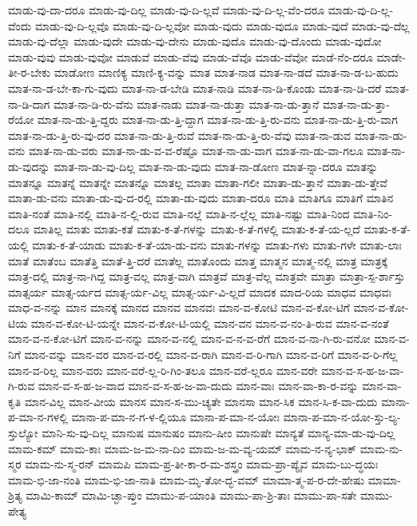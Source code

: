 {ಮಾಡು-ವು-ದಾ-ದರೂ
ಮಾಡು-ವು-ದಿಲ್ಲ
ಮಾಡು-ವು-ದಿ-ಲ್ಲವೆ
ಮಾಡು-ವು-ದಿ-ಲ್ಲ-ವೆಂ-ದರೂ
ಮಾಡು-ವು-ದಿ-ಲ್ಲ-ವೆಂದು
ಮಾಡು-ವು-ದಿ-ಲ್ಲವೊ
ಮಾಡು-ವು-ದಿ-ಲ್ಲವೋ
ಮಾಡು-ವುದು
ಮಾಡು-ವುದೂ
ಮಾಡು-ವುದೆ
ಮಾಡು-ವು-ದೆಲ್ಲ
ಮಾಡು-ವು-ದೆಲ್ಲಾ
ಮಾಡು-ವುದೇ
ಮಾಡು-ವು-ದೇನು
ಮಾಡು-ವುದೊ
ಮಾಡು-ವು-ದೊಂದು
ಮಾಡು-ವುದೋ
ಮಾಡು-ವುವು
ಮಾಡು-ವುವೋ
ಮಾಡುವೆ
ಮಾಡು-ವೆವು
ಮಾಡು-ವೆವೊ
ಮಾಡು-ವೆವೋ
ಮಾಡೆ-ನೆಂ-ದರೂ
ಮಾಡೇ-ತೀ-ರ-ಬೇಕು
ಮಾಡೋಣ
ಮಾಣಿಕ್ಯ
ಮಾಣಿ-ಕ್ಯ-ವನ್ನು
ಮಾತ
ಮಾತ-ನಾಡ
ಮಾತ-ನಾ-ಡದೆ
ಮಾತ-ನಾ-ಡ-ಬ-ಹುದು
ಮಾತ-ನಾ-ಡ-ಬೇ-ಕಾ-ಗು-ವುದು
ಮಾತ-ನಾ-ಡ-ಬೇಡಿ
ಮಾತ-ನಾಡಿ
ಮಾತ-ನಾ-ಡಿ-ಕೊಂಡು
ಮಾತ-ನಾ-ಡಿ-ದರೆ
ಮಾತ-ನಾ-ಡಿ-ದಾಗ
ಮಾತ-ನಾ-ಡಿ-ರು-ವೆನು
ಮಾತ-ನಾಡು
ಮಾತ-ನಾ-ಡುತ್ತಾ
ಮಾತ-ನಾ-ಡು-ತ್ತಾನೆ
ಮಾತ-ನಾ-ಡು-ತ್ತಾ-ರೆಯೋ
ಮಾತ-ನಾ-ಡು-ತ್ತಿ-ದ್ದರು
ಮಾತ-ನಾ-ಡು-ತ್ತಿ-ದ್ದಾಗ
ಮಾತ-ನಾ-ಡು-ತ್ತಿ-ರು-ವನು
ಮಾತ-ನಾ-ಡು-ತ್ತಿ-ರು-ವಾಗ
ಮಾತ-ನಾ-ಡು-ತ್ತಿ-ರು-ವು-ದರ
ಮಾತ-ನಾ-ಡು-ತ್ತಿ-ರುವೆ
ಮಾತ-ನಾ-ಡು-ತ್ತಿ-ರು-ವೆವು
ಮಾತ-ನಾ-ಡುವ
ಮಾತ-ನಾ-ಡು-ವನು
ಮಾತ-ನಾ-ಡು-ವರು
ಮಾತ-ನಾ-ಡು-ವ-ವ-ರೆಷ್ಟೊ
ಮಾತ-ನಾ-ಡು-ವಾಗ
ಮಾತ-ನಾ-ಡು-ವಾ-ಗಲೂ
ಮಾತ-ನಾ-ಡು-ವುದನ್ನು
ಮಾತ-ನಾ-ಡು-ವು-ದಿಲ್ಲ
ಮಾತ-ನಾ-ಡು-ವುದು
ಮಾತ-ನಾ-ಡೋಣ
ಮಾತ-ನ್ನಾ-ದರೂ
ಮಾತನ್ನು
ಮಾತನ್ನೂ
ಮಾತನ್ನೆ
ಮಾತನ್ನೇ
ಮಾತನ್ನೊ
ಮಾತಲ್ಲ
ಮಾತಾ
ಮಾತಾ-ಗಲೀ
ಮಾತಾ-ಡು-ತ್ತಾನೆ
ಮಾತಾ-ಡು-ತ್ತೇವೆ
ಮಾತಾ-ಡು-ವನು
ಮಾತಾ-ಡು-ವು-ದ-ರಲ್ಲಿ
ಮಾತಾ-ಡು-ವುದು
ಮಾತಾ-ದರೂ
ಮಾತಿ
ಮಾತಿಗೂ
ಮಾತಿಗೆ
ಮಾತಿನ
ಮಾತಿ-ನಂತೆ
ಮಾತಿ-ನಲ್ಲಿ
ಮಾತಿ-ನ-ಲ್ಲಿ-ರುವ
ಮಾತಿ-ನಲ್ಲೆ
ಮಾತಿ-ನ-ಲ್ಲೆಲ್ಲ
ಮಾತಿ-ನಷ್ಟು
ಮಾತಿ-ನಿಂದ
ಮಾತಿ-ನಿಂ-ದಲೂ
ಮಾತಿಲ್ಲ
ಮಾತು
ಮಾತು-ಕತೆ
ಮಾತು-ಕ-ತೆ-ಗಳನ್ನು
ಮಾತು-ಕ-ತೆ-ಗಳಲ್ಲಿ
ಮಾತು-ಕ-ತೆ-ಯ-ಲ್ಲದೆ
ಮಾತು-ಕ-ತೆ-ಯಲ್ಲಿ
ಮಾತು-ಕ-ತೆ-ಯಾಡು
ಮಾತು-ಕ-ತೆ-ಯಾ-ಡು-ವನು
ಮಾತು-ಗಳನ್ನು
ಮಾತು-ಗಳು
ಮಾತು-ಗಳೇ
ಮಾತು-ಲಾಃ
ಮಾತೆ
ಮಾತೆಂಬ
ಮಾತೆತ್ತಿ
ಮಾತೆ-ತ್ತಿ-ದರೆ
ಮಾತೆಲ್ಲ
ಮಾತೊಂದು
ಮಾತ್ತ
ಮಾತ್ಮನ
ಮಾತ್ಮ-ನಲ್ಲಿ
ಮಾತ್ರ
ಮಾತ್ರಕ್ಕೆ
ಮಾತ್ರ-ದಲ್ಲಿ
ಮಾತ್ರ-ನಾ-ಗಿದ್ದ
ಮಾತ್ರ-ವಲ್ಲ
ಮಾತ್ರ-ವಾಗಿ
ಮಾತ್ರವೆ
ಮಾತ್ರ-ವೆಲ್ಲ
ಮಾತ್ರವೇ
ಮಾತ್ರಾ
ಮಾತ್ರಾ-ಸ್ಪ-ರ್ಶಾಸ್ತು
ಮಾತ್ಸರ್ಯ
ಮಾತ್ಸ-ರ್ಯದ
ಮಾತ್ಸ-ರ್ಯ-ವಿಲ್ಲ
ಮಾತ್ಸ-ರ್ಯ-ವಿ-ಲ್ಲದೆ
ಮಾದಕ
ಮಾದ-ರಿಯ
ಮಾಧವ
ಮಾಧವಃ
ಮಾಧ-ವ-ನನ್ನು
ಮಾನ
ಮಾನಕ್ಕೆ
ಮಾನದ
ಮಾನವ
ಮಾನವಃ
ಮಾನ-ವ-ಕೋಟಿ
ಮಾನ-ವ-ಕೋ-ಟಿಗೆ
ಮಾನ-ವ-ಕೋ-ಟಿಯ
ಮಾನ-ವ-ಕೋ-ಟಿ-ಯನ್ನೇ
ಮಾನ-ವ-ಕೋ-ಟಿ-ಯಲ್ಲಿ
ಮಾನ-ವನ
ಮಾನ-ವ-ನಂ-ತಿ-ರುವ
ಮಾನ-ವ-ನಂತೆ
ಮಾನ-ವ-ನ-ಕೋ-ಟಿಗೆ
ಮಾನ-ವ-ನನ್ನು
ಮಾನ-ವ-ನಲ್ಲಿ
ಮಾನ-ವ-ನ-ವ-ರೆಗೆ
ಮಾನ-ವ-ನಾ-ಗಿ-ರು-ವನೋ
ಮಾನ-ವ-ನಿಗೆ
ಮಾನ-ವನ್ನು
ಮಾನ-ವರ
ಮಾನ-ವ-ರಲ್ಲಿ
ಮಾನ-ವ-ರಾಗಿ
ಮಾನ-ವ-ರಿ-ಗಾಗಿ
ಮಾನ-ವ-ರಿಗೆ
ಮಾನ-ವ-ರಿ-ಗೆಲ್ಲ
ಮಾನ-ವ-ರಿಲ್ಲ
ಮಾನ-ವರು
ಮಾನ-ವರೆ-ಲ್ಲ-ರಿ-ಗಿಂ-ತಲೂ
ಮಾನ-ವರೆ-ಲ್ಲರೂ
ಮಾನ-ವರೇ
ಮಾನ-ವ-ಸ-ಹ-ಜ-ವಾ-ಗಿ-ರುವ
ಮಾನ-ವ-ಸ-ಹ-ಜ-ವಾದ
ಮಾನ-ವ-ಸ-ಹ-ಜ-ವಾ-ದುದು
ಮಾನ-ವಾಃ
ಮಾನ-ವಾ-ಕಾ-ರ-ವನ್ನು
ಮಾನ-ವಾ-ಕೃತಿ
ಮಾನ-ವಿಲ್ಲ
ಮಾನ-ವೀಯ
ಮಾನಸ
ಮಾನ-ಸ-ಮು-ಚ್ಯತೇ
ಮಾನಸಾ
ಮಾನ-ಸಿಕ
ಮಾನ-ಸಿ-ಕ-ವಾ-ದುದು
ಮಾನಾ-ಪ-ಮಾ-ನ-ಗಳಲ್ಲಿ
ಮಾನಾ-ಪ-ಮಾ-ನ-ಗ-ಳ-ಲ್ಲಿಯೂ
ಮಾನಾ-ಪ-ಮಾ-ನ-ಯೋಃ
ಮಾನಾ-ಪ-ಮಾ-ನ-ಯೋ-ಸ್ತು-ಲ್ಯ-ಸ್ತುಲ್ಯೋ
ಮಾನಿ-ಸು-ವು-ದಿಲ್ಲ
ಮಾನುಷ
ಮಾನುಷಂ
ಮಾನು-ಷೀಂ
ಮಾನುಷೇ
ಮಾನ್ಯತೆ
ಮಾನ್ಯ-ಮಾ-ಡು-ವು-ದಿಲ್ಲ
ಮಾಮ-ಕಮ್
ಮಾಮ-ಕಾಃ
ಮಾಮ-ಜ-ಮ-ನಾ-ದಿಂ
ಮಾಮ-ಜ-ಮ-ವ್ಯ-ಯಮ್
ಮಾಮ-ನ-ನ್ಯ-ಭಾಕ್
ಮಾಮ-ನು-ಸ್ಮರ
ಮಾಮ-ನು-ಸ್ಮ-ರನ್
ಮಾಮಪಿ
ಮಾಮ-ಪ್ರ-ತೀ-ಕಾ-ರ-ಮ-ಶಸ್ತ್ರಂ
ಮಾಮ-ಪ್ರಾ-ಪ್ಯೈವ
ಮಾಮ-ಬು-ದ್ಧಯಃ
ಮಾಮ-ಭಿ-ಜಾ-ನಂತಿ
ಮಾಮ-ಭಿ-ಜಾ-ನಾತಿ
ಮಾಮ-ಮೃ-ತೋ-ದ್ಭ-ವಮ್
ಮಾಮಾ-ತ್ಮ-ಪ-ರ-ದೇ-ಹೇಷು
ಮಾಮಾ-ಶ್ರಿತ್ಯ
ಮಾಮಿ-ಕಾಮ್
ಮಾಮಿ-ಚ್ಛಾ-ಪ್ತುಂ
ಮಾಮು-ಪ-ಯಾಂತಿ
ಮಾಮು-ಪಾ-ಶ್ರಿ-ತಾಃ
ಮಾಮು-ಪಾ-ಸತೇ
ಮಾಮು-ಪೇತ್ಯ
}
